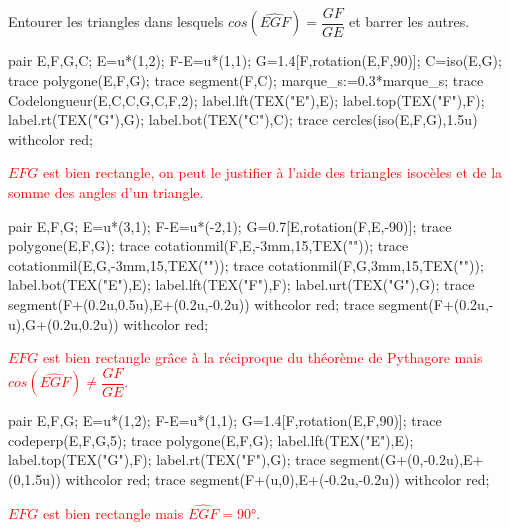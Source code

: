 \begin{corrige}
    Entourer les triangles dans lesquels \mbox{$cos(\widehat{EGF})=\dfrac{GF}{GE}$} et barrer les autres.
    
    \begin{minipage}{0.45\linewidth}
        \begin{Geometrie}
            pair E,F,G,C;
            E=u*(1,2);
            F-E=u*(1,1);            
            G=1.4[F,rotation(E,F,90)];
            C=iso(E,G);            
            trace polygone(E,F,G);
            trace segment(F,C);
            marque_s:=0.3*marque_s;
            trace Codelongueur(E,C,C,G,C,F,2);
            label.lft(TEX("E"),E);
            label.top(TEX("F"),F);
            label.rt(TEX("G"),G);
            label.bot(TEX("C"),C);
            trace cercles(iso(E,F,G),1.5u) withcolor red;
        \end{Geometrie}
        \textcolor{red}{$EFG$ est bien rectangle, on peut le justifier à l'aide des triangles isocèles et de la somme des angles d'un triangle.}

        \bigskip
        \begin{Geometrie}
            pair E,F,G;
            E=u*(3,1);
            F-E=u*(-2,1);            
            G=0.7[E,rotation(F,E,-90)];            
            trace polygone(E,F,G);            
            trace cotationmil(F,E,-3mm,15,TEX(""));
            trace cotationmil(E,G,-3mm,15,TEX(""));
            trace cotationmil(F,G,3mm,15,TEX(""));
            label.bot(TEX("E"),E);
            label.lft(TEX("F"),F);
            label.urt(TEX("G"),G);
            trace segment(F+(0.2u,0.5u),E+(0.2u,-0.2u)) withcolor red;
            trace segment(F+(0.2u,-u),G+(0.2u,0.2u)) withcolor red;
        \end{Geometrie}
        \textcolor{red}{$EFG$ est bien rectangle grâce à la réciproque du théorème de Pythagore mais $cos(\widehat{EGF})\neq\dfrac{GF}{GE}$.}
    \end{minipage}
    \hfill
    \begin{minipage}{0.45\linewidth}
        \begin{Geometrie}
            pair E,F,G;
            E=u*(1,2);
            F-E=u*(1,1);            
            G=1.4[F,rotation(E,F,90)];
            trace codeperp(E,F,G,5);
            trace polygone(E,F,G);
            label.lft(TEX("E"),E);
            label.top(TEX("G"),F);
            label.rt(TEX("F"),G);
            trace segment(G+(0,-0.2u),E+(0,1.5u)) withcolor red;
            trace segment(F+(u,0),E+(-0.2u,-0.2u)) withcolor red;
        \end{Geometrie}
        \textcolor{red}{$EFG$ est bien rectangle mais $\widehat{EGF}=\ang{90}$.}


\end{minipage}
\end{corrige}
